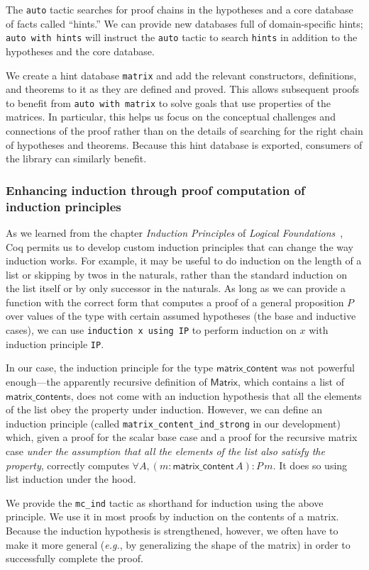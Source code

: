 \documentclass[11pt,conference]{IEEEtran}
\newcommand{\func}[1]{\mathsf{#1}}
\theoremstyle{plain} %
\theoremstyle{definition}
\theoremstyle{remark}
\begin{document}
The \texttt{auto} tactic searches for proof chains in the hypotheses and a core
database of facts called ``hints.'' We can provide new databases full of
domain-specific hints; \texttt{auto with hints} will instruct the \texttt{auto}
tactic to search \texttt{hints} in addition to the hypotheses and the core
database.

We create a hint database \texttt{matrix} and add the relevant constructors,
definitions, and theorems to it as they are defined and proved. This allows
subsequent proofs to benefit from \texttt{auto with matrix} to solve goals that
use properties of the matrices. In particular, this helps us focus on the
conceptual challenges and connections of the proof rather than on the details of
searching for the right chain of hypotheses and theorems. Because this hint
database is exported, consumers of the library can similarly benefit.

\subsubsection{Enhancing induction through proof computation of induction
principles}\label{S:coq_ind}

As we learned from the chapter \textit{Induction Principles} of \textit{Logical
Foundations}~\cite{Pierce:SF1}, Coq permits us to develop custom induction
principles that can change the way induction works. For example, it may be
useful to do induction on the length of a list or skipping by twos in the
naturals, rather than the standard induction on the list itself or by only
successor in the naturals. As long as we can provide a function with the correct
form that computes a proof of a general proposition \(P\) over values of the
type with certain assumed hypotheses (the base and inductive cases), we can use
\texttt{induction x using IP} to perform induction on \(x\) with
induction principle \texttt{IP}.

In our case, the induction principle for the type \(\func{matrix\_content}\) was
not powerful enough---the apparently recursive definition of \(\func{Matrix}\),
which contains a list of \(\func{matrix\_content}\)s, does not come with an
induction hypothesis that all the elements of the list obey the property under
induction. However, we can define an induction principle (called
\texttt{matrix\_content\_ind\_strong} in our development) which, given a proof
for the scalar base case and a proof for the recursive matrix case \emph{under
the assumption that all the elements of the list also satisfy the property},
correctly computes \(\forall A, (m: \func{matrix\_content}\, A) : P\, m\). It does
so using list induction under the hood.

We provide the \texttt{mc\_ind} tactic as shorthand for induction using the
above principle. We use it in most proofs by induction on the contents of a
matrix. Because the induction hypothesis is strengthened, however, we often have
to make it more general (\textit{e.g.}, by generalizing the shape of the matrix)
in order to successfully complete the proof.

{\printbibliography}
\end{document}
